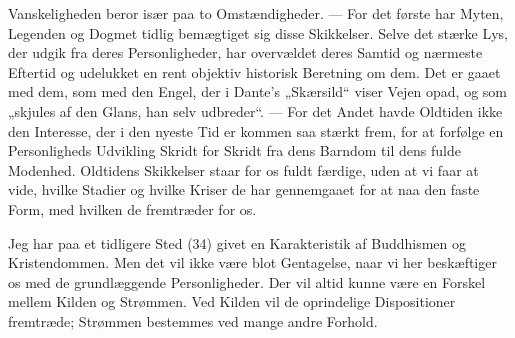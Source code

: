\documentclass[12pt,a4paper,openany]{book}
\begin{document}
Vanskeligheden beror især paa to Omstændigheder. --- For det første har
Myten, Legenden og Dogmet tidlig bemægtiget sig disse Skikkelser. Selve
det stærke Lys, der udgik fra deres Personligheder, har overvældet deres
Samtid og nærmeste Eftertid og udelukket en rent objektiv historisk
Beretning om dem. Det er gaaet med dem, som med den Engel, der i Dante’s
„Skærsild“ viser Vejen opad, og som „skjules af den Glans, han selv
udbreder“. --- For det Andet havde Oldtiden ikke den Interesse, der i
den nyeste Tid er kommen saa stærkt frem, for at forfølge en
Personligheds Udvikling Skridt for Skridt fra dens Barndom til dens
fulde Modenhed. Oldtidens Skikkelser staar for os fuldt færdige, uden at
vi faar at vide, hvilke Stadier og hvilke Kriser de har gennemgaaet for
at naa den faste Form, med hvilken de fremtræder for os.

Jeg har paa et tidligere Sted (34) givet en Karakteristik af Buddhismen
og Kristendommen. Men det vil ikke være blot Gentagelse, naar vi her
beskæftiger os med de grundlæggende Personligheder. Der vil altid kunne
være en Forskel mellem Kilden og Strømmen. Ved Kilden vil de oprindelige
Dispositioner fremtræde; Strømmen bestemmes ved mange andre Forhold.
\end{document}
